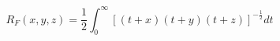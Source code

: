 \documentclass[12pt]{article}
\begin{document}
\begin{displaymath}
R_F(x, y, z) = \frac{1}{2} \int_{0}^{\infty} [(t+x)(t+y)(t+z)]^{-\frac{1}{2}} dt
\end{displaymath}
\end{document}
